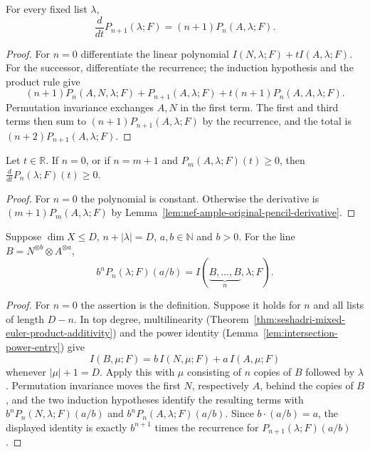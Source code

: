 \begin{lemma}
\label{lem:nef-ample-original-pencil-derivative}
\leanok
{}
For every fixed list $\lambda$,
\[
 \frac{d}{dt}P_{n+1}(\lambda;F)=(n+1)P_n(A,\lambda;F).
\]
\end{lemma}
\begin{proof}
For $n=0$ differentiate the linear polynomial $I(N,\lambda;F)+tI(A,\lambda;F)$. For the
successor, differentiate the recurrence; the induction hypothesis and the product rule give
\[
 (n+1)P_n(A,N,\lambda;F)+P_{n+1}(A,\lambda;F)+t(n+1)P_n(A,A,\lambda;F).
\]
Permutation invariance exchanges $A,N$ in the first term. The first and third terms then sum
to $(n+1)P_{n+1}(A,\lambda;F)$ by the recurrence, and the total is
$(n+2)P_{n+1}(A,\lambda;F)$.
\end{proof}

\begin{lemma}
\label{lem:nef-ample-original-pencil-derivative-nonneg}
\leanok
{}
Let $t\in\mathbb R$. If $n=0$, or if $n=m+1$ and $P_m(A,\lambda;F)(t)\geq0$, then
$\frac{d}{dt}P_n(\lambda;F)(t)\geq0$.
\end{lemma}
\begin{proof}
For $n=0$ the polynomial is constant. Otherwise the derivative is
$(m+1)P_m(A,\lambda;F)$ by Lemma~\ref{lem:nef-ample-original-pencil-derivative}.
\end{proof}

\begin{lemma}
\label{lem:nef-ample-original-pencil-rational-scaling}
\leanok
{}
Suppose $\dim X\le D$, $n+|\lambda|=D$, $a,b\in\mathbb N$ and $b>0$. For the line
$B=N^{\otimes b}\otimes A^{\otimes a}$,
\[
 b^n P_n(\lambda;F)(a/b)=I(\underbrace{B,\ldots,B}_{n},\lambda;F).
\]
\end{lemma}
\begin{proof}
For $n=0$ the assertion is the definition. Suppose it holds for $n$ and all lists of length
$D-n$. In top degree, multilinearity
(Theorem~\ref{thm:seshadri-mixed-euler-product-additivity}) and the power identity
(Lemma~\ref{lem:intersection-power-entry}) give
\[
 I(B,\mu;F)=b\,I(N,\mu;F)+a\,I(A,\mu;F)
\]
whenever $|\mu|+1=D$. Apply this with $\mu$ consisting of $n$ copies of $B$ followed by
$\lambda$. Permutation invariance moves the first $N$, respectively $A$, behind the copies of
$B$, and the two induction hypotheses identify the resulting terms with
$b^n P_n(N,\lambda;F)(a/b)$ and $b^n P_n(A,\lambda;F)(a/b)$. Since $b\cdot(a/b)=a$, the
displayed identity is exactly $b^{n+1}$ times the recurrence for $P_{n+1}(\lambda;F)(a/b)$.
\end{proof}

